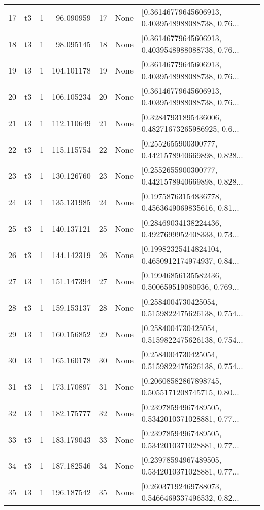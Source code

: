 \begin{tabular}{lllrlll}
17  &  t3 &   1 &   96.090959 &   17 &  None &  [0.36146779645606913, 0.4039548988088738, 0.76... \\
18  &  t3 &   1 &   98.095145 &   18 &  None &  [0.36146779645606913, 0.4039548988088738, 0.76... \\
19  &  t3 &   1 &  104.101178 &   19 &  None &  [0.36146779645606913, 0.4039548988088738, 0.76... \\
20  &  t3 &   1 &  106.105234 &   20 &  None &  [0.36146779645606913, 0.4039548988088738, 0.76... \\
21  &  t3 &   1 &  112.110649 &   21 &  None &  [0.32847931895436006, 0.48271673265986925, 0.6... \\
22  &  t3 &   1 &  115.115754 &   22 &  None &  [0.2552655900300777, 0.4421578940669898, 0.828... \\
23  &  t3 &   1 &  130.126760 &   23 &  None &  [0.2552655900300777, 0.4421578940669898, 0.828... \\
24  &  t3 &   1 &  135.131985 &   24 &  None &  [0.19758763154836778, 0.4563649069835616, 0.81... \\
25  &  t3 &   1 &  140.137121 &   25 &  None &  [0.28469034138224436, 0.4927699952408333, 0.73... \\
26  &  t3 &   1 &  144.142319 &   26 &  None &  [0.19982325414824104, 0.4650912174974937, 0.84... \\
27  &  t3 &   1 &  151.147394 &   27 &  None &  [0.19946856135582436, 0.500659519080936, 0.769... \\
28  &  t3 &   1 &  159.153137 &   28 &  None &  [0.2584004730425054, 0.5159822475626138, 0.754... \\
29  &  t3 &   1 &  160.156852 &   29 &  None &  [0.2584004730425054, 0.5159822475626138, 0.754... \\
30  &  t3 &   1 &  165.160178 &   30 &  None &  [0.2584004730425054, 0.5159822475626138, 0.754... \\
31  &  t3 &   1 &  173.170897 &   31 &  None &  [0.20608582867898745, 0.5055171208745715, 0.80... \\
32  &  t3 &   1 &  182.175777 &   32 &  None &  [0.23978594967489505, 0.5342010371028881, 0.77... \\
33  &  t3 &   1 &  183.179043 &   33 &  None &  [0.23978594967489505, 0.5342010371028881, 0.77... \\
34  &  t3 &   1 &  187.182546 &   34 &  None &  [0.23978594967489505, 0.5342010371028881, 0.77... \\
35  &  t3 &   1 &  196.187542 &   35 &  None &  [0.26037192469788073, 0.5466469337496532, 0.82... \\

\end{tabular}
